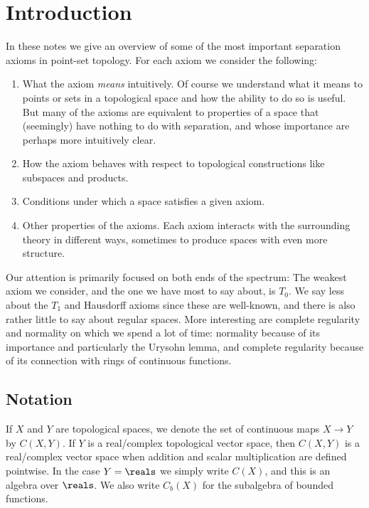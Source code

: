 \documentclass[article, a4paper, 11pt, oneside]{memoir}
\title{\doctitle}
\author{\docauthor}
\numberwithin{equation}{chapter}
\begin{document}
\maketitle

\chapter{Introduction}

In these notes we give an overview of some of the most important separation axioms in point-set topology. For each axiom we consider the following:
%
\begin{enumerate}
    \item What the axiom \emph{means} intuitively. Of course we understand what it means to  points or sets in a topological space and how the ability to do so is useful. But many of the axioms are equivalent to properties of a space that (seemingly) have nothing to do with separation, and whose importance are perhaps more intuitively clear.

    \item How the axiom behaves with respect to topological constructions like subspaces and products.
    
    \item Conditions under which a space satisfies a given axiom.

    \item Other properties of the axioms. Each axiom interacts with the surrounding theory in different ways, sometimes to produce spaces with even more structure.
\end{enumerate}
%
Our attention is primarily focused on both ends of the spectrum: The weakest axiom we consider, and the one we have most to say about, is $T_0$. We say less about the $T_1$ and Hausdorff axioms since these are well-known, and there is also rather little to say about regular spaces. More interesting are complete regularity and normality on which we spend a lot of time: normality because of its importance and particularly the Urysohn lemma, and complete regularity because of its connection with rings of continuous functions.


\section{Notation}

If $X$ and $Y$ are topological spaces, we denote the set of continuous maps $X \to Y$ by $C(X,Y)$. If $Y$ is a real/complex topological vector space, then $C(X,Y)$ is a real/complex vector space when addition and scalar multiplication are defined pointwise. In the case $Y = \reals$ we simply write $C(X)$, and this is an algebra over $\reals$. We also write $C_b(X)$ for the subalgebra of bounded functions.
\end{document}
